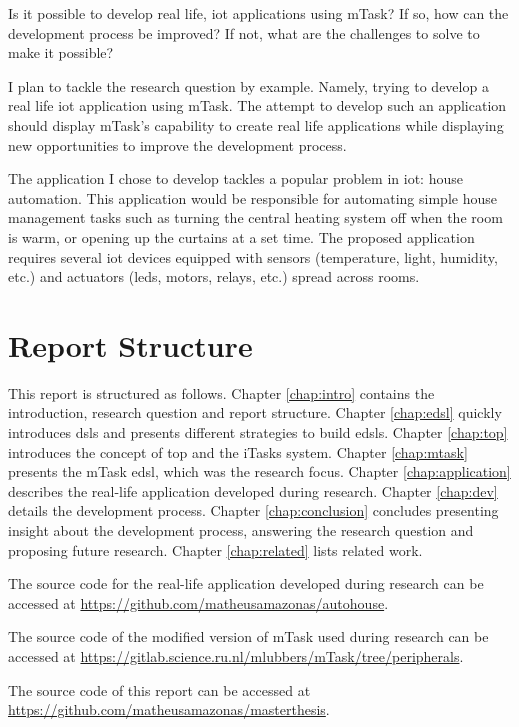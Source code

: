 Is it possible to develop real life, \acs{iot} applications using mTask? If so, how can the development process be improved? If not, what are the challenges to solve to make it possible?

I plan to tackle the research question by example. Namely, trying to develop a real life \acs{iot} application using mTask. The attempt to develop such an application should display mTask's capability to create real life applications while displaying new opportunities to improve the development process.

The application I chose to develop tackles a popular problem in \acrshort{iot}: house automation. This application would be responsible for automating simple house management tasks such as turning the central heating system off when the room is warm, or opening up the curtains at a set time. The proposed application requires several \acrshort{iot} devices equipped with sensors (temperature, light, humidity, etc.) and actuators (\acsp{led}, motors, relays, etc.) spread across rooms. 


\section{Report Structure}

This report is structured as follows. Chapter \ref{chap:intro} contains the introduction, research question and report structure. Chapter \ref{chap:edsl} quickly introduces \acp{dsl} and presents different strategies to build \acp{edsl}. Chapter \ref{chap:top} introduces the concept of \ac{top} and the iTasks system. Chapter \ref{chap:mtask} presents the mTask \ac{edsl}, which was the research focus. Chapter \ref{chap:application} describes the real-life application developed during research. Chapter \ref{chap:dev} details the development process. Chapter \ref{chap:conclusion} concludes presenting insight about the development process, answering the research question and proposing future research. Chapter \ref{chap:related} lists related work.

The source code for the real-life application developed during research can be accessed at \url{https://github.com/matheusamazonas/autohouse}.

The source code of the modified version of mTask used during research can be accessed at \url{https://gitlab.science.ru.nl/mlubbers/mTask/tree/peripherals}.

The source code of this report can be accessed at \url{https://github.com/matheusamazonas/masterthesis}.


